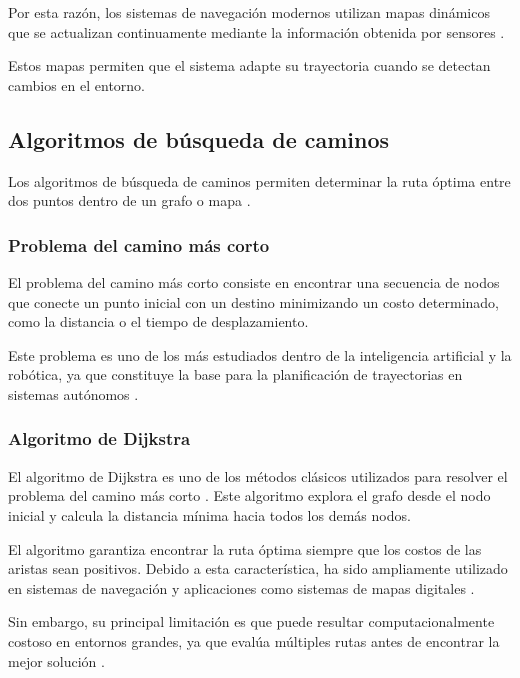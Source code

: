 Por esta razón, los sistemas de navegación modernos utilizan mapas dinámicos que se actualizan continuamente mediante la información obtenida por sensores \cite{fox1997dynamic}.

Estos mapas permiten que el sistema adapte su trayectoria cuando se detectan cambios en el entorno.

\subsection{Algoritmos de búsqueda de caminos}

Los algoritmos de búsqueda de caminos permiten determinar la ruta óptima entre dos puntos dentro de un grafo o mapa \cite{lavalle2006planning}.

\subsubsection{Problema del camino más corto}

El problema del camino más corto consiste en encontrar una secuencia de nodos que conecte un punto inicial con un destino minimizando un costo determinado, como la distancia o el tiempo de desplazamiento.

Este problema es uno de los más estudiados dentro de la inteligencia artificial y la robótica, ya que constituye la base para la planificación de trayectorias en sistemas autónomos \cite{lavalle2006planning}.

\subsubsection{Algoritmo de Dijkstra}

El algoritmo de Dijkstra es uno de los métodos clásicos utilizados para resolver el problema del camino más corto \cite{dijkstra1959}. Este algoritmo explora el grafo desde el nodo inicial y calcula la distancia mínima hacia todos los demás nodos.

El algoritmo garantiza encontrar la ruta óptima siempre que los costos de las aristas sean positivos. Debido a esta característica, ha sido ampliamente utilizado en sistemas de navegación y aplicaciones como sistemas de mapas digitales \cite{dijkstra1959}.

Sin embargo, su principal limitación es que puede resultar computacionalmente costoso en entornos grandes, ya que evalúa múltiples rutas antes de encontrar la mejor solución \cite{lavalle2006planning}.

